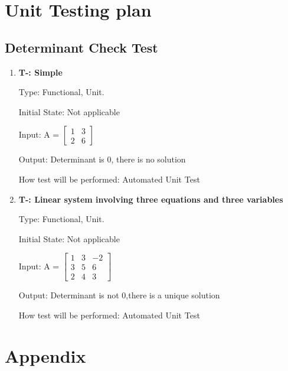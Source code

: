 \documentclass[12pt, titlepage]{article}
\newcounter{tnum}
\begin{document}
\section{Unit Testing plan}

\subsection{Determinant Check Test}

\begin{enumerate}

\item{\textbf{T-\thetnum \label{t-determinant1}: Simple }}

Type: Functional, Unit.
					
Initial State: Not applicable
					
Input: A = $\begin{bmatrix} 
1 & 3 \\
2 & 6 
\end{bmatrix}$
					
Output: Determinant is 0, there is no solution
					
How test will be performed: Automated Unit Test
					
\item{\textbf{T-\thetnum \label{t-determinant2}: Linear system involving three equations and three variables }}

Type: Functional, Unit.
					
Initial State:  Not applicable
					
Input: A = $\begin{bmatrix} 
1 & 3 & -2 \\
3 & 5 & 6\\
2 & 4 & 3
\end{bmatrix}$
					
Output: Determinant is not 0,there is a unique solution
					
How test will be performed: Automated Unit Test 

\end{enumerate}







\newpage

\section{Appendix}
\end{document}
